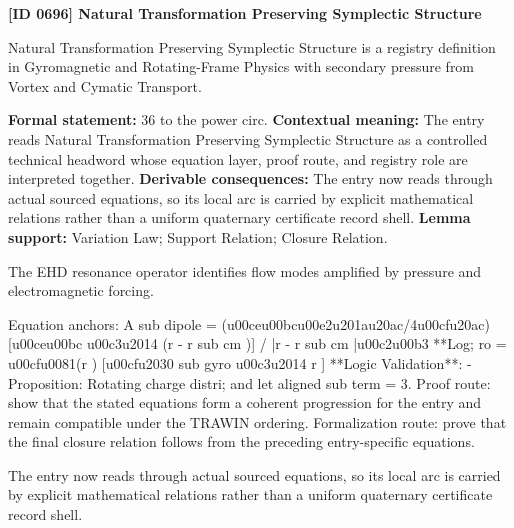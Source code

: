 \clearpage
\noindent\textbf{[ID 0696] Natural Transformation Preserving Symplectic Structure}\par
\vspace{0.35em}
\begingroup\small
{}
Natural Transformation Preserving Symplectic Structure is a registry definition in Gyromagnetic and Rotating-Frame Physics with secondary pressure from Vortex and Cymatic Transport.

\begingroup\footnotesize\setlength{\emergencystretch}{3em}\sloppy
\textbf{Formal statement:} 36 to the power circ. \textbf{Contextual meaning:} The entry reads Natural Transformation Preserving Symplectic Structure as a controlled technical headword whose equation layer, proof route, and registry role are interpreted together. \textbf{Derivable consequences:} The entry now reads through actual sourced equations, so its local arc is carried by explicit mathematical relations rather than a uniform quaternary certificate record shell. \textbf{Lemma support:} Variation Law; Support Relation; Closure Relation.\par
\endgroup

The EHD resonance operator identifies flow modes amplified by pressure and electromagnetic forcing.

Equation anchors: A sub dipole = (u00ceu00bcu00e2u201au20ac/4u00cfu20ac) [u00ceu00bc u00c3u2014 (r - r sub cm )] / |r - r sub cm |u00c2u00b3 **Log; ro = u00cfu0081(r ) [u00cfu2030 sub gyro u00c3u2014 r ] **Logic Validation**: - Proposition: Rotating charge distri; and let aligned sub term = 3. Proof route: show that the stated equations form a coherent progression for the entry and remain compatible under the TRAWIN ordering. Formalization route: prove that the final closure relation follows from the preceding entry-specific equations.

The entry now reads through actual sourced equations, so its local arc is carried by explicit mathematical relations rather than a uniform quaternary certificate record shell.
\endgroup

